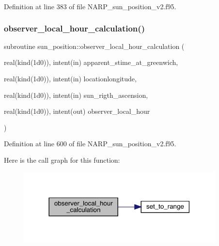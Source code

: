 Definition at line 383 of file N\+A\+R\+P\+\_\+sun\+\_\+position\+\_\+v2.\+f95.

\mbox{\label{_n_a_r_p__sun__position__v2_8f95_a424caca5b8ba1c7b5f230c2808d623bd}} 
\subsubsection{\texorpdfstring{observer\+\_\+local\+\_\+hour\+\_\+calculation()}{observer\_local\_hour\_calculation()}}
{\footnotesize\ttfamily subroutine sun\+\_\+position\+::observer\+\_\+local\+\_\+hour\+\_\+calculation (\begin{DoxyParamCaption}\item[{real(kind(1d0)), intent(in)}]{apparent\+\_\+stime\+\_\+at\+\_\+greenwich,  }\item[{real(kind(1d0)), intent(in)}]{locationlongitude,  }\item[{real(kind(1d0)), intent(in)}]{sun\+\_\+rigth\+\_\+ascension,  }\item[{real(kind(1d0)), intent(out)}]{observer\+\_\+local\+\_\+hour }\end{DoxyParamCaption})}



Definition at line 600 of file N\+A\+R\+P\+\_\+sun\+\_\+position\+\_\+v2.\+f95.

Here is the call graph for this function\+:\nopagebreak
\begin{figure}[H]
\begin{center}
\leavevmode
\includegraphics[width=297pt]{_n_a_r_p__sun__position__v2_8f95_a424caca5b8ba1c7b5f230c2808d623bd_cgraph}
\end{center}
\end{figure}
\mbox{\label{_n_a_r_p__sun__position__v2_8f95_a000bdf57aa5a15bc65fc0b3521f461e7}} 
